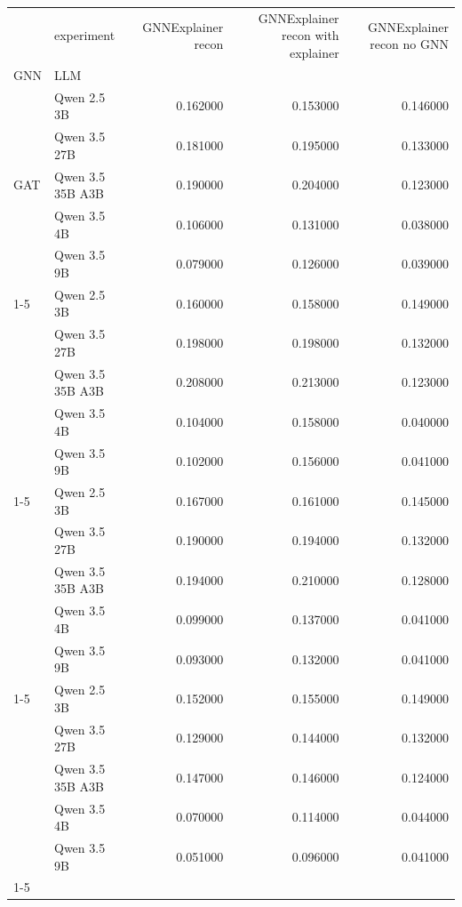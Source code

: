 \begin{tabular}{llrrr}
\toprule
 & experiment & GNNExplainer recon & GNNExplainer recon with explainer & GNNExplainer recon no GNN \\
GNN & LLM &  &  &  \\
\midrule
\multirow[t]{5}{*}{GAT} & Qwen 2.5 3B & 0.162000 & 0.153000 & 0.146000 \\
 & Qwen 3.5 27B & 0.181000 & 0.195000 & 0.133000 \\
 & Qwen 3.5 35B A3B & 0.190000 & 0.204000 & 0.123000 \\
 & Qwen 3.5 4B & 0.106000 & 0.131000 & 0.038000 \\
 & Qwen 3.5 9B & 0.079000 & 0.126000 & 0.039000 \\
\cline{1-5}
\multirow[t]{5}{*}{GCN} & Qwen 2.5 3B & 0.160000 & 0.158000 & 0.149000 \\
 & Qwen 3.5 27B & 0.198000 & 0.198000 & 0.132000 \\
 & Qwen 3.5 35B A3B & 0.208000 & 0.213000 & 0.123000 \\
 & Qwen 3.5 4B & 0.104000 & 0.158000 & 0.040000 \\
 & Qwen 3.5 9B & 0.102000 & 0.156000 & 0.041000 \\
\cline{1-5}
\multirow[t]{5}{*}{GIN} & Qwen 2.5 3B & 0.167000 & 0.161000 & 0.145000 \\
 & Qwen 3.5 27B & 0.190000 & 0.194000 & 0.132000 \\
 & Qwen 3.5 35B A3B & 0.194000 & 0.210000 & 0.128000 \\
 & Qwen 3.5 4B & 0.099000 & 0.137000 & 0.041000 \\
 & Qwen 3.5 9B & 0.093000 & 0.132000 & 0.041000 \\
\cline{1-5}
\multirow[t]{5}{*}{GraphSAGE} & Qwen 2.5 3B & 0.152000 & 0.155000 & 0.149000 \\
 & Qwen 3.5 27B & 0.129000 & 0.144000 & 0.132000 \\
 & Qwen 3.5 35B A3B & 0.147000 & 0.146000 & 0.124000 \\
 & Qwen 3.5 4B & 0.070000 & 0.114000 & 0.044000 \\
 & Qwen 3.5 9B & 0.051000 & 0.096000 & 0.041000 \\
\cline{1-5}
\bottomrule
\end{tabular}
